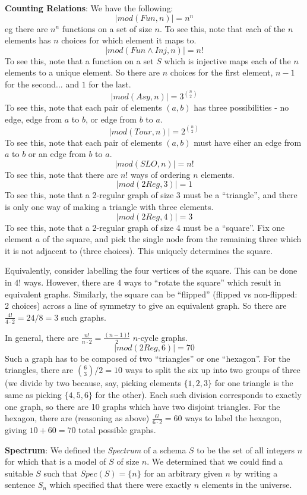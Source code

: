 \begin{mdframed}[linewidth=1]
\textbf{Counting Relations}: We have the following:
\[
    |mod(Fun, n)| = n^n
\]
eg there are $n^n$ functions on a set of size $n$. To see this, note that each of the $n$ elements has $n$ choices for which element it maps to.
\[
    |mod(Fun \land Inj, n)| = n!
\]
To see this, note that a function on a set $S$ which is injective maps each of the $n$ elements to a unique element. So there are $n$ choices for the first element, $n-1$ for the second... and $1$ for the last. 
\[
    |mod(Asy, n)| = 3^{\binom{n}{2}}
\]
To see this, note that each pair of elements $(a, b)$ has three possibilities - no edge, edge from $a$ to $b$, or edge from $b$ to $a$. 
\[
    |mod(Tour, n)| = 2^{\binom{n}{2}}
\]
To see this, note that each pair of elements $(a, b)$ must have eiher an edge from $a$ to $b$ or an edge from $b$ to $a$. 
\[
    |mod(SLO, n)| = n!
\]
To see this, note that there are $n!$ ways of ordering $n$ elements. 
\[
    |mod(2Reg, 3)| = 1
\]
To see this, note that a 2-regular graph of size 3 must be a ``triangle'', and there is only one way of making a triangle with three elements. 
\[
    |mod(2Reg, 4)| = 3
\]
To see this, note that a 2-regular graph of size 4 must be a ``square''. Fix one element $a$ of the square, and pick the single node from the remaining three which it is not adjacent to (three choices). This uniquely determines the square. 

Equivalently, consider labelling the four vertices of the square. This can be done in $4!$ ways. However, there are $4$ ways to ``rotate the square'' which result in equivalent graphs. Similarly, the square can be ``flipped'' (flipped vs non-flipped: 2 choices) across a line of symmetry to give an equivalent graph. So there are $\frac{4!}{4\cdot 2} = 24/8 = 3$ such graphs.

In general, there are $\frac{n!}{n\cdot 2} = \frac{(n-1)!}{2}$ $n$-cycle graphs. 
\[
    |mod(2Reg, 6)| = 70
\] 
Such a graph has to be composed of two ``triangles'' or one ``hexagon''. For the triangles, there are $\binom{6}{3}/2 = 10$ ways to split the six up into two groups of three (we divide by two because, say, picking elements $\{1, 2, 3\}$ for one triangle is the same as picking $\{4, 5, 6\}$ for the other). Each such division corresponds to exactly one graph, so there are 10 graphs which have two disjoint triangles. For the hexagon, there are (reasoning as above) $\frac{6!}{6 \cdot 2} = 60$ ways to label the hexagon, giving $10 + 60 = 70$ total possible graphs. 

\textbf{Spectrum}: We defined the \emph{Spectrum} of a schema $S$ to be the set of all integers $n$ for which that is a model of $S$ of size $n$. We determined that we could find a suitable $S$ such that $Spec(S) = \{n\}$ for an arbitrary given $n$ by writing a sentence $S_n$ which specified that there were exactly $n$ elements in the universe.


\end{mdframed}
